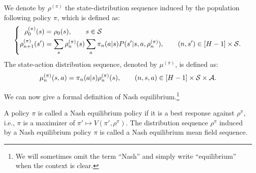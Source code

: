 \documentclass{article}
\begin{document}
\begin{definition}
We denote by $\rho^{(\pi)}$ the state-distribution sequence induced by the population following policy $\pi$, which is defined as:
\begin{equation}
    \left\{ 
    \begin{split}
    \rho_0^{(\pi)}(s) &= \rho_0(s), \qquad s \in \mathcal{S}
    \\
    \rho_{n+1}^{(\pi)}(s') &= \sum_s \rho_n^{(\pi)}(s) \sum_a \pi_n(a|s) P(s'|s,a,\rho_n^{(\pi)}), \qquad (n,s') \in [H-1] \times \mathcal{S}.
    \end{split}
    \right.
\end{equation}
The state-action distribution sequence, denoted by $\mu^{(\pi)}$, is defined as:
\begin{align}
    \mu_n^{(\pi)}(s,a) = \pi_n(a|s)\rho_n^{(\pi)}(s), \qquad  (n,s,a) \in [H-1] \times \mathcal{S} \times \mathcal{A}.
\end{align}
\end{definition}
We can now give a formal definition of Nash equilibrium.\footnote{We will sometimes omit the term ``Nash'' and simply write ``equilibrium'' when the context is clear.
}
\begin{definition}
\label{def:nash-eq}
A policy $\pi$ is called a Nash equilibrium policy if it is a best response against $\rho^\pi$, i.e., $\pi$ is a maximizer of $\pi' \mapsto V(\pi',\rho^\pi)$. The distribution sequence $\rho^\pi$ induced by a Nash equilibrium policy $\pi$ is called a Nash equilibrium mean field sequence. 
\end{definition}
\end{document}
